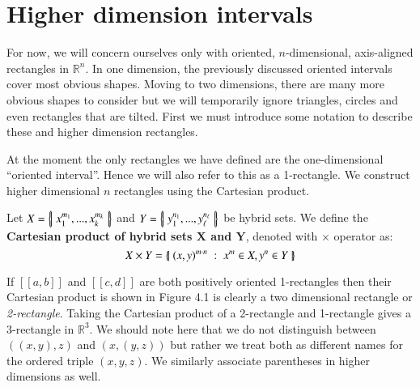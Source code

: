 
\section{Higher dimension intervals}

For now, we will concern ourselves only with oriented, $n$-dimensional, axis-aligned rectangles in $\mathbb{R}^n$.
In one dimension, the previously discussed oriented intervals cover most obvious shapes.
Moving to two dimensions, there are many more obvious shapes to consider but we will temporarily ignore triangles, circles and even rectangles that are tilted.
First we must introduce some notation to describe these and higher dimension rectangles. 

At the moment the only rectangles we have defined are the one-dimensional ``oriented interval''.
Hence we will also refer to this as a 1-rectangle.
We construct higher dimensional $n$ rectangles using the Cartesian product.
\begin{definition}
	Let $X = \left\{ \! \left| \;  x_1^{m_1}, ... , x_k^{m_k}  \; \right| \! \right\}$ and $Y= \left\{ \! \left| \;  y_1^{n_1}, ... , y_\ell^{n_\ell}  \; \right| \! \right\}$ be hybrid sets.
	We define the \textbf{Cartesian product of hybrid sets $\boldsymbol{X}$ and $\boldsymbol{Y}$}, denoted with $\times$ operator as:
	\begin{equation}
		X \times Y = \left\{ \! \left| \;  (x, y)^{m \cdot n} \; : \; x^m \in X, y^n \in Y  \; \right| \! \right\}
	 \end{equation}
\end{definition}

If $[\![a,b]\!]$ and $[\![c,d]\!]$ are both positively oriented 1-rectangles then their Cartesian product is shown in Figure 4.1 is clearly a two dimensional rectangle or \emph{2-rectangle}. 
Taking the Cartesian product of a 2-rectangle and 1-rectangle gives a 3-rectangle in $\mathbb{R}^3$. 
We should note here that we do not distinguish between $((x,y),z)$ and $(x,(y,z))$ but rather we treat both as different names for the ordered triple $(x,y,z)$.
We similarly associate parentheses in higher dimensions as well.

